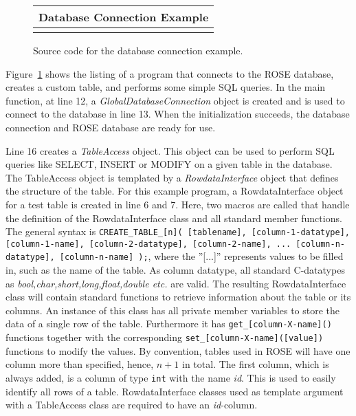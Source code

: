 \begin{latexonly}
\begin{figure}[tb]
\begin{center}
\begin{tabular}{|c|} \hline
     Database Connection Example
\\\hline\hline

\\\hline
\end{tabular}
\end{center}
\caption{ \label{fig:TutDB:Connection} Source code for the database connection example. }
\end{figure}
\end{latexonly}


Figure~\ref{fig:TutDB:Connection} shows the listing of a program that connects
to the ROSE database, creates a custom table, and performs some simple 
SQL queries. In the main function, at line 12, a \emph{GlobalDatabaseConnection} object is created
and is used to connect to the database in line 13. When the initialization
succeeds, the database connection and ROSE database are ready for use.

Line 16 creates a \emph{TableAccess} object. This object can be used to perform 
SQL queries like SELECT, INSERT or MODIFY on a given table in the database. The TableAccess
object is templated by a \emph{RowdataInterface} object that defines the structure 
of the table. For this example program, a RowdataInterface object for a test table
is created in line 6 and 7. Here, two macros are called that handle the definition of
the RowdataInterface class and all standard member functions. The general syntax
is {\tt CREATE\_TABLE\_[n]( [tablename], [column-1-datatype], [column-1-name], 
[column-2-datatype], [column-2-name], ... [column-n-datatype], [column-n-name] );},
where the ''[...]'' represents values to be filled in, such as the name of the table. As column datatype, all standard
C-datatypes as {\em bool,char,short,long,float,double etc.} are valid. The resulting
RowdataInterface class will contain standard functions to retrieve information about the table or
its columns. An instance of this class has all private member variables to store
the data of a single row of the table. Furthermore it has {\tt get\_[column-X-name]()} functions together with 
the corresponding {\tt set\_[column-X-name]([value])} functions to modify the values. By 
convention, tables used in ROSE will have one column more than specified, hence, $n+1$ in total.
The first column, which is always added, is a column of type {\tt int} with the name
{\em id}. This is used to easily identify all rows of a table. RowdataInterface classes
used as template argument with a TableAccess class are required to have an {\em id}-column.


